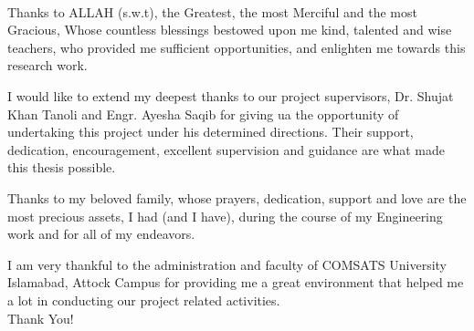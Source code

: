 \begin{titlepage}
\begin{center}
 \\
\end{center}
  \vspace*{0.5cm}
\noindent Thanks to ALLAH (s.w.t), the Greatest, the most Merciful and the most Gracious, Whose countless blessings bestowed upon me kind, talented and wise teachers, who provided me sufficient opportunities, and enlighten me towards this research work.\vspace{.25cm}

\noindent I would like to extend my deepest thanks to our project supervisors, Dr. Shujat Khan Tanoli and Engr. Ayesha Saqib for giving ua the opportunity of undertaking this project under his determined directions. Their support, dedication, encouragement, excellent supervision and guidance are what made this thesis possible. \vspace{.25cm}

\noindent Thanks to my beloved family, whose prayers, dedication, support and love are the most precious assets, I had (and I have), during the course of my Engineering work and for all of my endeavors.\vspace{.25cm}

\noindent I am very thankful to the administration and faculty of COMSATS University Islamabad, Attock Campus for providing me a great environment that helped me a lot in conducting our project related activities. \vspace{5mm} \\


\noindent Thank You!






\end{titlepage}
